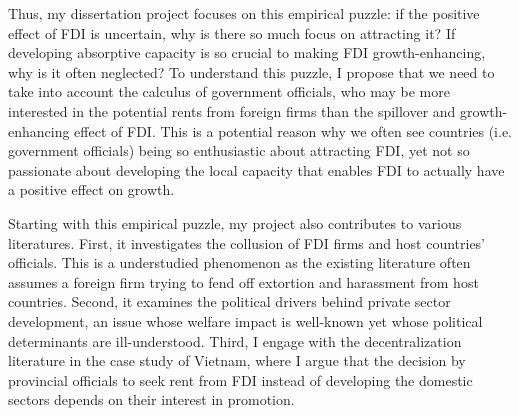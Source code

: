 Thus, my dissertation project focuses on this empirical puzzle: if the positive effect of FDI is uncertain, why is there so much focus on attracting it? If developing absorptive capacity is so crucial to making FDI growth-enhancing, why is it often neglected? To understand this puzzle, I propose that we need to take into account the calculus of government officials, who may be more interested in the potential rents from foreign firms than the spillover and growth-enhancing effect of FDI. This is a potential reason why we often see countries (i.e. government officials) being so enthusiastic about attracting FDI, yet not so passionate about developing the local capacity that enables FDI to actually have a positive effect on growth.

Starting with this empirical puzzle, my project also contributes to various literatures. First, it investigates the collusion of FDI firms and host countries' officials. This is a understudied phenomenon as the existing literature often assumes a foreign firm trying to fend off extortion and harassment from host countries. Second, it examines the political drivers behind private sector development, an issue whose welfare impact is well-known yet whose political determinants are ill-understood. Third, I engage with the decentralization literature in the case study of Vietnam, where I argue that the decision by provincial officials to seek rent from FDI instead of developing the domestic sectors depends on their interest in promotion.
